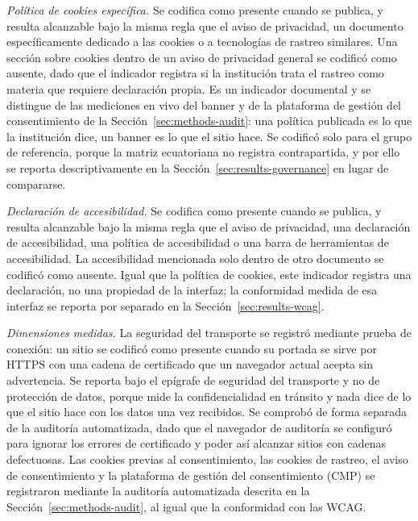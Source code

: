\documentclass[pdflatex,sn-basic,Numbered,iicol]{sn-jnl}
\theoremstyle{thmstyleone}
\theoremstyle{thmstyletwo}
\theoremstyle{thmstylethree}
\begin{document}
\emph{Pol\'itica de cookies espec\'ifica.} Se codifica como presente cuando se publica, y resulta alcanzable bajo la misma regla que el aviso de privacidad, un documento espec\'ificamente dedicado a las cookies o a tecnolog\'ias de rastreo similares. Una secci\'on sobre cookies dentro de un aviso de privacidad general se codific\'o como ausente, dado que el indicador registra si la instituci\'on trata el rastreo como materia que requiere declaraci\'on propia. Es un indicador documental y se distingue de las mediciones en vivo del banner y de la plataforma de gesti\'on del consentimiento de la Secci\'on~\ref{sec:methods-audit}: una pol\'itica publicada es lo que la instituci\'on dice, un banner es lo que el sitio hace. Se codific\'o solo para el grupo de referencia, porque la matriz ecuatoriana no registra contrapartida, y por ello se reporta descriptivamente en la Secci\'on~\ref{sec:results-governance} en lugar de compararse.

\emph{Declaraci\'on de accesibilidad.} Se codifica como presente cuando se publica, y resulta alcanzable bajo la misma regla que el aviso de privacidad, una declaraci\'on de accesibilidad, una pol\'itica de accesibilidad o una barra de herramientas de accesibilidad. La accesibilidad mencionada solo dentro de otro documento se codific\'o como ausente. Igual que la pol\'itica de cookies, este indicador registra una declaraci\'on, no una propiedad de la interfaz; la conformidad medida de esa interfaz se reporta por separado en la Secci\'on~\ref{sec:results-wcag}.

\emph{Dimensiones medidas.} La seguridad del transporte se registr\'o mediante prueba de conexi\'on: un sitio se codific\'o como presente cuando su portada se sirve por HTTPS con una cadena de certificado que un navegador actual acepta sin advertencia. Se reporta bajo el ep\'igrafe de seguridad del transporte y no de protecci\'on de datos, porque mide la confidencialidad en tr\'ansito y nada dice de lo que el sitio hace con los datos una vez recibidos. Se comprob\'o de forma separada de la auditor\'ia automatizada, dado que el navegador de auditor\'ia se configur\'o para ignorar los errores de certificado y poder as\'i alcanzar sitios con cadenas defectuosas. Las cookies previas al consentimiento, las cookies de rastreo, el aviso de consentimiento y la plataforma de gesti\'on del consentimiento (CMP) se registraron mediante la auditor\'ia automatizada descrita en la Secci\'on~\ref{sec:methods-audit}, al igual que la conformidad con las WCAG.
\end{document}
